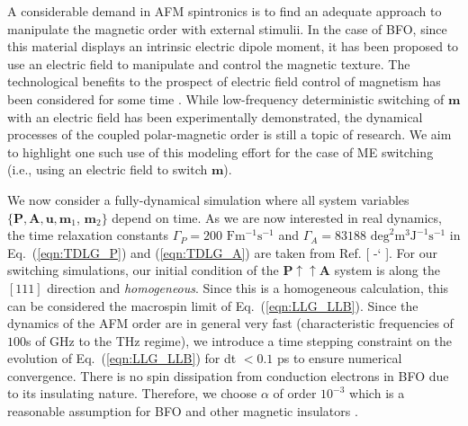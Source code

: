 \documentclass[%
 reprint,
superscriptaddress,
 amsmath,amssymb,
prb,
]{revtex4-1}
\newcommand*{\citen}[1]{%
  \begingroup
    \romannumeral-`\x %
    \setcitestyle{numbers}%
    \cite{#1}%
  \endgroup   
}
\begin{document}
A considerable demand in AFM spintronics is to find an adequate approach to manipulate the magnetic order with external stimulii.
%
%
In the case of BFO, since this material displays an intrinsic electric dipole moment, it has been proposed to use an electric field to manipulate and control the magnetic texture.
%
The technological benefits to the prospect of electric field control of magnetism has been considered for some time \cite{Heron2014, Matsukura2015, Song2017, Liu2021, Parsonet2022}.
%
While low-frequency deterministic switching of $\mathbf{m}$ with an electric field has been experimentally demonstrated\cite{Heron2014}, the dynamical processes of the coupled polar-magnetic order is still a topic of research\cite{Liao2020a, Liao2020b}. 
%
We aim to highlight one such use of this modeling effort for the case of ME switching (i.e., using an electric field to switch $\mathbf{m}$).
%

%
We now consider a fully-dynamical simulation where all system variables $\{\mathbf{P},\mathbf{A},\mathbf{u},\mathbf{m}_1$, $\mathbf{m}_2\}$ depend on time.
%
As we are now interested in real dynamics, the time relaxation constants $\Gamma_P = 200$ $\mathrm{F}\mathrm{m}^{-1}\mathrm{s}^{-1}$ and $\Gamma_A = 83188$ $\mathrm{deg}^2\mathrm{m}^{3}\mathrm{J}^{-1} \mathrm{s}^{-1}$ in Eq.~(\ref{eqn:TDLG_P}) and (\ref{eqn:TDLG_A}) are taken from Ref. [\citen{PrivCommFedorova2023}].
%
%
For our switching simulations, our initial condition of the $\mathbf{P}\uparrow\uparrow\mathbf{A}$ system is along the $[111]$ direction and \emph{homogeneous}.
%
Since this is a homogeneous calculation, this can be considered the macrospin limit of Eq.~(\ref{eqn:LLG_LLB}). 
%
Since the dynamics of the AFM order are in general very fast (characteristic frequencies of $100$s of GHz to the THz regime)\cite{Jungwirth2016}, we introduce a time stepping constraint on the evolution of Eq.~(\ref{eqn:LLG_LLB}) for dt $ < 0.1$ ps to ensure numerical convergence.
%
There is no spin dissipation from conduction electrons in BFO due to its insulating nature.
%
Therefore, we choose $\alpha$ of order $10^{-3}$ which is a reasonable assumption for BFO \cite{Wang2012, Bhattacharjee2014} and other magnetic insulators \cite{Kapelrud2013, Shiino2016, Soumah2018, Chen2021}.
%
\end{document}
